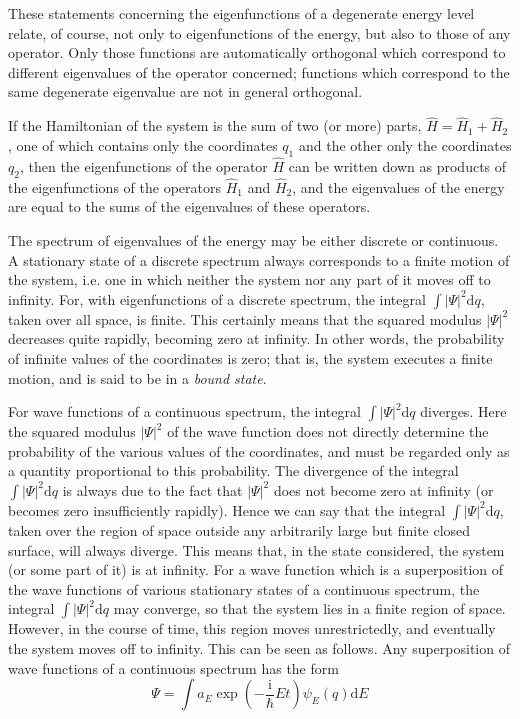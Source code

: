 These statements concerning the eigenfunctions of a degenerate energy level relate, of course, not only to eigenfunctions of the energy, but also to those of any operator. Only those functions are automatically orthogonal which correspond to different eigenvalues of the operator concerned; functions which correspond to the same degenerate eigenvalue are not in general orthogonal.

If the Hamiltonian of the system is the sum of two (or more) parts, $ \hat{H} = \hat{H}_1 + \hat{H}_2 $, one of which contains only the coordinates $ q_1 $ and the other only the coordinates $ q_2 $, then the eigenfunctions of the operator $\hat{H}$ can be written down as products of the eigenfunctions of the operators $\hat{H}_1$ and $\hat{H}_2$, and the eigenvalues of the energy are equal to the sums of the eigenvalues of these operators.

The spectrum of eigenvalues of the energy may be either discrete or continuous. A stationary state of a discrete spectrum always corresponds to a finite motion of the system, i.e. one in which neither the system nor any part of it moves off to infinity. For, with eigenfunctions of a discrete spectrum, the integral $\int|\Psi|^2\mathrm{d}q$, taken over all space, is finite. This certainly means that the squared modulus $ |\Psi|^2 $ decreases quite rapidly, becoming zero at infinity. In other words, the probability of infinite values of the coordinates is zero; that is, the system executes a finite motion, and is said to be in a \textit{bound state}.

For wave functions of a continuous spectrum, the integral $\int|\Psi|^2\mathrm{d}q$ diverges. Here the squared modulus $ |\Psi|^2 $ of the wave function does not directly determine the probability of the various values of the coordinates, and must be regarded only as a quantity proportional to this probability. The divergence of the integral $\int|\Psi|^2\mathrm{d}q$ is always due to the fact that $ |\Psi|^2 $ does not become zero at infinity (or becomes zero insufficiently rapidly). Hence we can say that the integral $\int|\Psi|^2\mathrm{d}q$, taken over the region of space outside any arbitrarily large but finite closed surface, will always diverge. This means that, in the state considered, the system (or some part of it) is at infinity. For a wave function which is a superposition of the wave functions of various stationary states of a continuous spectrum, the integral $\int|\Psi|^2\mathrm{d}q$ may converge, so that the system lies in a finite region of space. However, in the course of time, this region moves unrestrictedly, and eventually the system moves off to infinity. This can be seen as follows. Any superposition of wave functions of a continuous spectrum has the form
\[ \Psi=\int a_E\exp\left( -\frac{\mathrm{i}}{\hbar}Et\right)\psi_E(q)\mathrm{d}E \]



